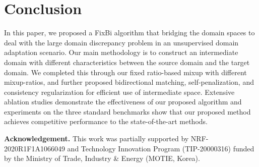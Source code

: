 \documentclass[final]{cvpr}
\begin{document}
\section{Conclusion}
In this paper, we proposed a FixBi algorithm that bridging the domain spaces to deal with the large domain discrepancy problem in an unsupervised domain adaptation scenario. Our main methodology is to construct an intermediate domain with different characteristics between the source domain and the target domain. We completed this through our fixed ratio-based mixup with different mixup-ratios, and further proposed bidirectional matching, self-penalization, and consistency regularization for efficient use of intermediate space.
Extensive ablation studies demonstrate the effectiveness of our proposed algorithm and experiments on the three standard benchmarks show that our proposed method achieves competitive performance to the state-of-the-art methods.

\textbf{Acknowledgement.} This work was partially supported by NRF-2020R1F1A1066049 and Technology Innovation Program (TIP-20000316) funded by the Ministry of Trade, Industry \& Energy (MOTIE, Korea).


{\small


}
\end{document}
